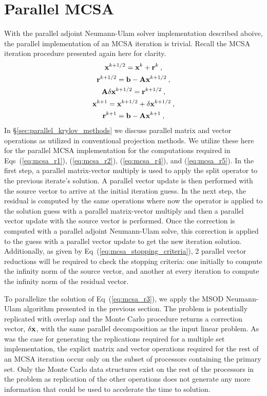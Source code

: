 \section{Parallel MCSA\ }
\label{sec:parallel_mcsa}
With the parallel adjoint Neumann-Ulam solver implementation described
aboive, the parallel implementation of an MCSA iteration is
trivial. Recall the MCSA iteration procedure presented again here for
clarity.
\begin{subequations}
  \begin{gather}
    \label{eq:mcsa_r1}
    \mathbf{x}^{k+1/2} = \mathbf{x}^k + \mathbf{r}^k\:,\\
    \label{eq:mcsa_r2}
    \mathbf{r}^{k+1/2} = \mathbf{b} - \mathbf{A}\mathbf{x}^{k+1/2}\:,\\
    \label{eq:mcsa_r3}
    \mathbf{A}\delta\mathbf{x}^{k+1/2} = \mathbf{r}^{k+1/2}\:,\\
    \label{eq:mcsa_r4}
    \mathbf{x}^{k+1} = \mathbf{x}^{k+1/2} + \delta \mathbf{x}^{k+1/2}\:,\\
    \label{eq:mcsa_r5}
    \mathbf{r}^{k+1} = \mathbf{b} - \mathbf{A}\mathbf{x}^{k+1}\:,
  \end{gather}
\end{subequations}
In \S\ref{sec:parallel_krylov_methods} we discuss parallel matrix and
vector operations as utilized in conventional projection methods. We
utilize these here for the parallel MCSA implementation for the
computations required in Eqs~(\ref{eq:mcsa_r1}), (\ref{eq:mcsa_r2}),
(\ref{eq:mcsa_r4}), and (\ref{eq:mcsa_r5}). In the first step, a
parallel matrix-vector multiply is used to apply the split operator to
the previous iterate's solution. A parallel vector update is then
performed with the source vector to arrive at the initial iteration
guess. In the next step, the residual is computed by the same
operations where now the operator is applied to the solution guess
with a parallel matrix-vector multiply and then a parallel vector
update with the source vector is performed. Once the correction is
computed with a parallel adjoint Neumann-Ulam solve, this correction
is applied to the guess with a parallel vector update to get the new
iteration solution. Additionally, as given by
Eq~(\ref{eq:mcsa_stopping_criteria}), 2 parallel vector reductions
will be required to check the stopping criteria: one initially to
compute the infinity norm of the source vector, and another at every
iteration to compute the infinity norm of the residual vector.

To parallelize the solution of Eq~(\ref{eq:mcsa_r3}), we apply the
MSOD Neumann-Ulam algorithm presented in the previous section. The
problem is potentially replicated with overlap and the Monte Carlo
procedure returns a correction vector, $\delta \mathbf{x}$, with the same
parallel decomposition as the input linear problem. As was the case
for generating the replications required for a multiple set
implementation, the explict matrix and vector operations required for
the rest of an MCSA iteration occur only on the subset of processors
containing the primary set. Only the Monte Carlo data structures exist
on the rest of the processors in the problem as replication of the
other operations does not generate any more information that could be
used to accelerate the time to solution.

